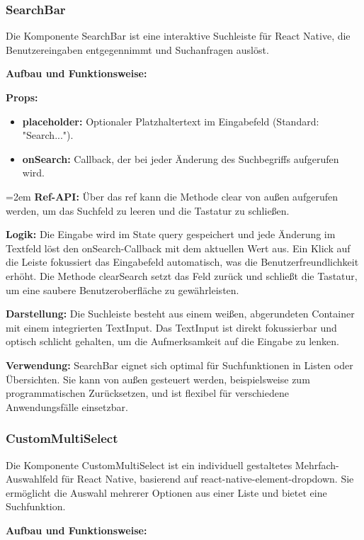 \subsubsection{SearchBar}
Die Komponente SearchBar ist eine interaktive Suchleiste für React Native, die Benutzereingaben entgegennimmt und Suchanfragen auslöst.

\noindent\textbf{Aufbau und Funktionsweise:}

\textbf{Props:}
\begin{itemize}
    \item \textbf{placeholder:} Optionaler Platzhaltertext im Eingabefeld (Standard: "Search...").
    \item \textbf{onSearch:} Callback, der bei jeder Änderung des Suchbegriffs aufgerufen wird.
\end{itemize}

\hangindent=2em
\textbf{Ref-API:}
Über das ref kann die Methode clear von außen aufgerufen werden, um das Suchfeld zu leeren und die Tastatur zu schließen.

\textbf{Logik:}
Die Eingabe wird im State query gespeichert und jede Änderung im Textfeld löst den onSearch-Callback mit dem aktuellen Wert aus. Ein Klick auf die Leiste fokussiert das Eingabefeld automatisch, was die Benutzerfreundlichkeit erhöht. Die Methode clearSearch setzt das Feld zurück und schließt die Tastatur, um eine saubere Benutzeroberfläche zu gewährleisten.

\textbf{Darstellung:}
Die Suchleiste besteht aus einem weißen, abgerundeten Container mit einem integrierten TextInput. Das TextInput ist direkt fokussierbar und optisch schlicht gehalten, um die Aufmerksamkeit auf die Eingabe zu lenken.

\noindent\textbf{Verwendung:} SearchBar eignet sich optimal für Suchfunktionen in Listen oder Übersichten. Sie kann von außen gesteuert werden, beispielsweise zum programmatischen Zurücksetzen, und ist flexibel für verschiedene Anwendungsfälle einsetzbar.

\subsubsection{CustomMultiSelect}
Die Komponente CustomMultiSelect ist ein individuell gestaltetes Mehrfach-Auswahlfeld für React Native, basierend auf react-native-element-dropdown. Sie ermöglicht die Auswahl mehrerer Optionen aus einer Liste und bietet eine Suchfunktion.

\noindent\textbf{Aufbau und Funktionsweise:}

